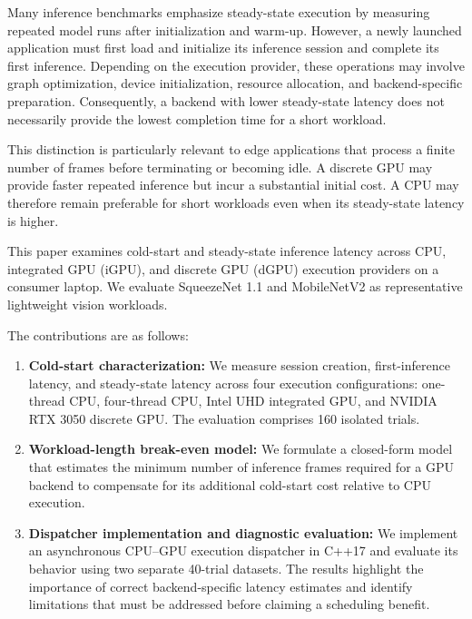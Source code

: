\documentclass[pdflatex,sn-mathphys-num]{sn-jnl}
\begin{document}
Many inference benchmarks emphasize steady-state execution by measuring repeated model runs after initialization and warm-up. However, a newly launched application must first load and initialize its inference session and complete its first inference. Depending on the execution provider, these operations may involve graph optimization, device initialization, resource allocation, and backend-specific preparation. Consequently, a backend with lower steady-state latency does not necessarily provide the lowest completion time for a short workload.

This distinction is particularly relevant to edge applications that process a finite number of frames before terminating or becoming idle. A discrete GPU may provide faster repeated inference but incur a substantial initial cost. A CPU may therefore remain preferable for short workloads even when its steady-state latency is higher.

This paper examines cold-start and steady-state inference latency across CPU, integrated GPU (iGPU), and discrete GPU (dGPU) execution providers on a consumer laptop. We evaluate SqueezeNet 1.1 \cite{iandola2016squeezenet} and MobileNetV2 \cite{sandler2018mobilenetv2} as representative lightweight vision workloads.

The contributions are as follows:

\begin{enumerate}
    \item \textbf{Cold-start characterization:} We measure session creation, first-inference latency, and steady-state latency across four execution configurations: one-thread CPU, four-thread CPU, Intel UHD integrated GPU, and NVIDIA RTX 3050 discrete GPU. The evaluation comprises 160 isolated trials.

    \item \textbf{Workload-length break-even model:} We formulate a closed-form model that estimates the minimum number of inference frames required for a GPU backend to compensate for its additional cold-start cost relative to CPU execution.

    \item \textbf{Dispatcher implementation and diagnostic evaluation:} We implement an asynchronous CPU--GPU execution dispatcher in C++17 and evaluate its behavior using two separate 40-trial datasets. The results highlight the importance of correct backend-specific latency estimates and identify limitations that must be addressed before claiming a scheduling benefit.
\end{enumerate}
\end{document}
